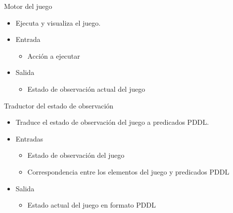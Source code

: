 \documentclass[11pt]{beamer}    %
\begin{document}
    \begin{frame}{Motor del juego}
        \begin{itemize}
            \item Ejecuta y visualiza el juego.
            \item \alert{Entrada}
            \begin{itemize}
                \item Acción a ejecutar
            \end{itemize}
            \item \alert{Salida}
            \begin{itemize}
                \item Estado de observación actual del juego
            \end{itemize}
        \end{itemize}
    \end{frame}
    
    \begin{frame}{Traductor del estado de observación}
        \begin{itemize}
            \item Traduce el estado de observación del juego a predicados PDDL.
            \item \alert{Entradas}
            \begin{itemize}
                \item Estado de observación del juego
                \item Correspondencia entre los elementos del juego y predicados PDDL
            \end{itemize}
            \item \alert{Salida}
            \begin{itemize}
                \item Estado actual del juego en formato PDDL
            \end{itemize}
        \end{itemize}
    \end{frame}
\end{document}
